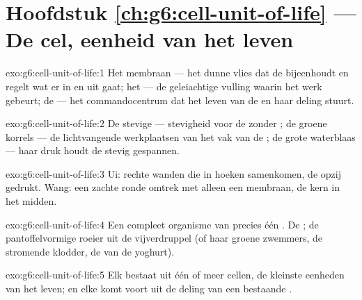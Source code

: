 \section*{Hoofdstuk \ref{ch:g6:cell-unit-of-life} --- De cel, eenheid van het leven}

\begin{solution}{exo:g6:cell-unit-of-life:1}
Het membraan --- het dunne vlies dat de  bijeenhoudt en regelt wat er
in en uit gaat; het  --- de geleiachtige vulling waarin het werk
gebeurt; de  --- het commandocentrum dat het leven van de  en
haar deling stuurt.
\end{solution}

\begin{solution}{exo:g6:cell-unit-of-life:2}
De stevige  --- stevigheid voor de  zonder ; de groene
korrels --- de lichtvangende werkplaatsen van het vak van de ;
de grote waterblaas --- haar druk houdt de  stevig gespannen.
\end{solution}

\begin{solution}{exo:g6:cell-unit-of-life:3}
Ui: rechte wanden die in hoeken samenkomen, de  opzij gedrukt.
Wang: een zachte ronde omtrek met alleen een membraan, de kern in het
midden.
\end{solution}

\begin{solution}{exo:g6:cell-unit-of-life:4}
Een compleet organisme van precies één . De ; de pantoffelvormige
roeier uit de vijverdruppel (of haar groene zwemmers, de stromende
klodder, de  van de yoghurt).
\end{solution}

\begin{solution}{exo:g6:cell-unit-of-life:5}
Elk  bestaat uit één of meer cellen, de kleinste eenheden van
het leven; en elke  komt voort uit de deling van een bestaande .
\end{solution}

